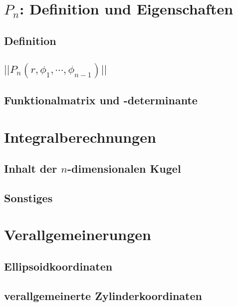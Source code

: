 \documentclass[a4paper,11pt]{report}
\theoremstyle{definition}
\begin{document}
\chapter{$P_n$: Definition und Eigenschaften}
\section{Definition}
\section{$||P_n(r,\phi_1,\cdots,\phi_{n-1})||$}
\section{Funktionalmatrix und -determinante}
\chapter{Integralberechnungen}
\section{Inhalt der $n$-dimensionalen Kugel}
\section{Sonstiges}%
\chapter{Verallgemeinerungen}
\section{\glqq Ellipsoidkoordinaten\grqq}%
\section{verallgemeinerte Zylinderkoordinaten}
\end{document}
